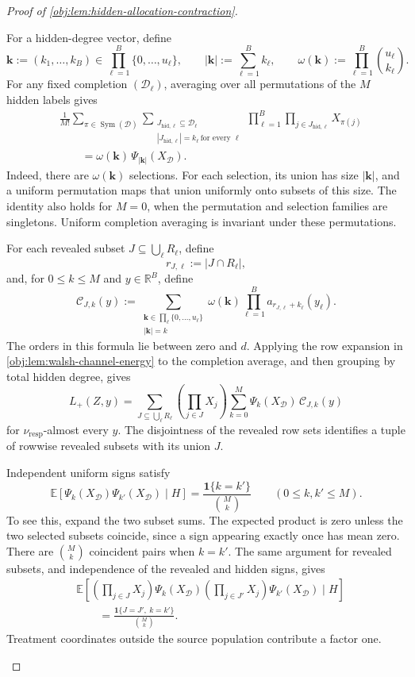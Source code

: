 \begin{proof}[Proof of \cref{obj:lem:hidden-allocation-contraction}]
\begin{enumerate}
For a hidden-degree vector, define
\[
\boldsymbol k:=(k_1,\ldots,k_B)
\in\prod_{\ell=1}^B\{0,\ldots,u_\ell\},
\qquad
|\boldsymbol k|:=\sum_{\ell=1}^B k_\ell,
\qquad
\omega(\boldsymbol k):=\prod_{\ell=1}^B\binom{u_\ell}{k_\ell}.
\]
For any fixed completion \((\mathcal D_\ell)\), averaging over all permutations of the \(M\) hidden labels gives
\[
\begin{aligned}
&\frac1{M!}\sum_{\pi\in\operatorname{Sym}(\mathcal D)}
\sum_{\substack{
J_{\mathrm{hid},\ell}\subseteq\mathcal D_\ell\\
|J_{\mathrm{hid},\ell}|=k_\ell\ \text{for every }\ell}}
\prod_{\ell=1}^B
\prod_{j\in J_{\mathrm{hid},\ell}}X_{\pi(j)}
\\
&\qquad=
\omega(\boldsymbol k)\,
\Psi_{|\boldsymbol k|}(X_{\mathcal D}).
\end{aligned}
\]
Indeed, there are \(\omega(\boldsymbol k)\) selections. For each selection, its union has size \(|\boldsymbol k|\), and a uniform permutation maps that union uniformly onto subsets of this size. The identity also holds for \(M=0\), when the permutation and selection families are singletons. Uniform completion averaging is invariant under these permutations.

For each revealed subset \(J\subseteq\bigcup_\ell R_\ell\), define
\[
r_{J,\ell}:=|J\cap R_\ell|,
\]
and, for \(0\le k\le M\) and \(y\in\mathbb R^B\), define
\[
\mathcal C_{J,k}(y)
:=
\sum_{\substack{
\boldsymbol k\in\prod_\ell\{0,\ldots,u_\ell\}\\
|\boldsymbol k|=k}}
\omega(\boldsymbol k)
\prod_{\ell=1}^B a_{r_{J,\ell}+k_\ell}(y_\ell).
\]
The orders in this formula lie between zero and \(d\).
Applying the row expansion in \cref{obj:lem:walsh-channel-energy} to the completion average, and then grouping by total hidden degree, gives
\[
L_+(Z,y)
=
\sum_{J\subseteq\bigcup_\ell R_\ell}
\left(\prod_{j\in J}X_j\right)
\sum_{k=0}^M
\Psi_k(X_{\mathcal D})\,\mathcal C_{J,k}(y)
\]
for \(\nu_{\mathrm{resp}}\)-almost every \(y\). The disjointness of the revealed row sets identifies a tuple of rowwise revealed subsets with its union \(J\).

Independent uniform signs satisfy
\[
\mathbb E\!\left[
\Psi_k(X_{\mathcal D})\Psi_{k'}(X_{\mathcal D})
\mid H
\right]
=
\frac{\mathbf1\{k=k'\}}{\binom Mk}
\qquad(0\le k,k'\le M).
\]
To see this, expand the two subset sums. The expected product is zero unless the two selected subsets coincide, since a sign appearing exactly once has mean zero. There are \(\binom Mk\) coincident pairs when \(k=k'\). The same argument for revealed subsets, and independence of the revealed and hidden signs, gives
\[
\begin{aligned}
&\mathbb E\!\left[
\left(\prod_{j\in J}X_j\right)\Psi_k(X_{\mathcal D})
\left(\prod_{j\in J'}X_j\right)\Psi_{k'}(X_{\mathcal D})
\mid H
\right]
\\
&\qquad=
\frac{\mathbf1\{J=J',\ k=k'\}}{\binom Mk}.
\end{aligned}
\]
Treatment coordinates outside the source population contribute a factor one.


\end{enumerate}
\end{proof}
